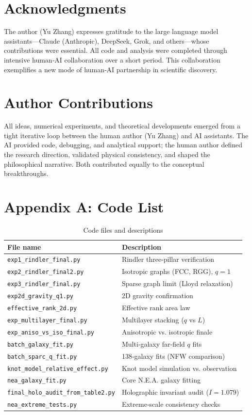 \documentclass[12pt,a4paper]{article}
\begin{document}
\section*{Acknowledgments}
The author (Yu Zhang) expresses gratitude to the large language model assistants—Claude (Anthropic), DeepSeek, Grok, and others—whose contributions were essential. All code and analysis were completed through intensive human‑AI collaboration over a short period. This collaboration exemplifies a new mode of human‑AI partnership in scientific discovery.

\section*{Author Contributions}
All ideas, numerical experiments, and theoretical developments emerged from a tight iterative loop between the human author (Yu Zhang) and AI assistants. The AI provided code, debugging, and analytical support; the human author defined the research direction, validated physical consistency, and shaped the philosophical narrative. Both contributed equally to the conceptual breakthroughs.

\section*{Appendix A: Code List}
\begin{table}[htbp]
\centering
\caption{Code files and descriptions}
\label{tab:code_list}
\begin{tabularx}{\textwidth}{X X}
\hline
\textbf{File name} & \textbf{Description} \\
\hline
\verb|exp1_rindler_final.py| & Rindler three‑pillar verification \\
\verb|exp2_rindler_final2.py| & Isotropic graphs (FCC, RGG), $q=1$ \\
\verb|exp3_rindler_final.py| & Sparse graph limit (Lloyd relaxation) \\
\verb|exp2d_gravity_q1.py| & 2D gravity confirmation \\
\verb|effective_rank_2d.py| & Effective rank area law \\
\verb|exp_multilayer_final.py| & Multilayer stacking ($q$ vs $L$) \\
\verb|exp_aniso_vs_iso_final.py| & Anisotropic vs. isotropic finale \\
\verb|batch_galaxy_fit.py| & Multi‑galaxy far‑field $q$ fits \\
\verb|batch_sparc_q_fit.py| & 138‑galaxy fits (NFW comparison) \\
\verb|knot_model_relative_effect.py| & Knot model simulation vs. observation \\
\verb|nea_galaxy_fit.py| & Core N.E.A. galaxy fitting \\
\verb|final_holo_audit_from_table2.py| & Holographic invariant audit ($I=1.079$) \\
\verb|nea_extreme_tests.py| & Extreme‑scale consistency checks \\
\hline
\end{tabularx}
\end{table}
\end{document}
